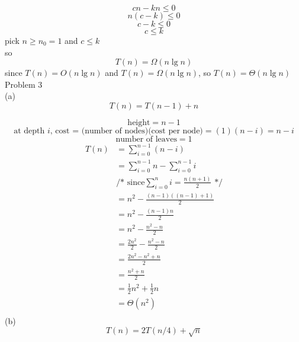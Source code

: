 \documentclass[12pt,border=4pt,multi]{article}%
\begin{document}
\[cn - kn \leq 0\]
\[n(c - k) \leq 0\]
\[c - k \leq 0\]
\[c \leq k\]
pick $n \geq n_0 = 1$ and $c \leq k$\\ 
so \[T(n) = \Omega(n \lg n)\]
since $T(n) = O(n \lg n)$ and $T(n) = \Omega(n \lg n)$, so $T(n) = \Theta(n \lg n)$
\newpage
\noindent
Problem 3\\
(a)
\[T(n) = T(n - 1) + n\]
\begin{center}
\end{center}
\[\text{height} = n - 1\]
\[\text{at depth $i$, cost = (number of nodes)(cost per node)} = (1)(n - i) = n - i\]
\[\text{number of leaves} = 1\]
\begin{align*}
    T(n) &=\sum_{i = 0}^{n - 1} (n - i)\\
    &= \sum_{i = 0}^{n - 1} n - \sum_{i = 0}^{n - 1} i\\
    &\text{/* since} \sum_{i = 0}^{n} i = \frac{n(n + 1)}{2} \text{ */}\\
    &= n^2 - \frac{(n - 1)((n - 1) + 1)}{2}\\
    &= n^2 - \frac{(n - 1)n}{2}\\
    &= n^2 - \frac{n^2 - n}{2}\\
    &= \frac{2n^2}{2} - \frac{n^2 - n}{2}\\
    &= \frac{2n^2 - n^2 + n}{2}\\
    &= \frac{n^2 + n}{2}\\
    &= \frac{1}{2}n^2 + \frac{1}{2}n\\
    &= \Theta(n^2)\\
\end{align*}
\newpage
\noindent
(b)
\[T(n) = 2T(n/4) + \sqrt{n}\]
\end{document}
